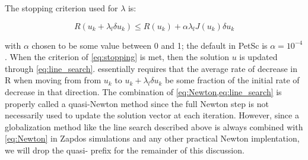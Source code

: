 The stopping criterion used for $\lambda$ is: \cite{dennis1996numerical}

\begin{equation}
  R(u_k+\lambda_l\delta u_k) \leq R(u_k) + \alpha\lambda_lJ(u_k)\delta u_k
  \label{eq:stopping}
\end{equation}

with $\alpha$ chosen to be some value between 0 and 1; the default in PetSc is $\alpha=10^{-4}$. When the criterion of \cref{eq:stopping} is met, then the solution $u$ is updated through \cref{eq:line_search}.  essentially requires that the average rate of decrease in R when moving from from $u_k$ to $u_k+\lambda_l\delta u_k$ be some fraction of the initial rate of decrease in that direction. The combination of \cref{eq:Newton,eq:line_search} is properly called a quasi-Newton method since the full Newton step is not necessarily used to update the solution vector at each iteration. However, since a globalization method like the line search described above is always combined with \cref{eq:Newton} in Zapdos simulations and any other practical Newton implentation, we will drop the quasi- prefix for the remainder of this discussion.


